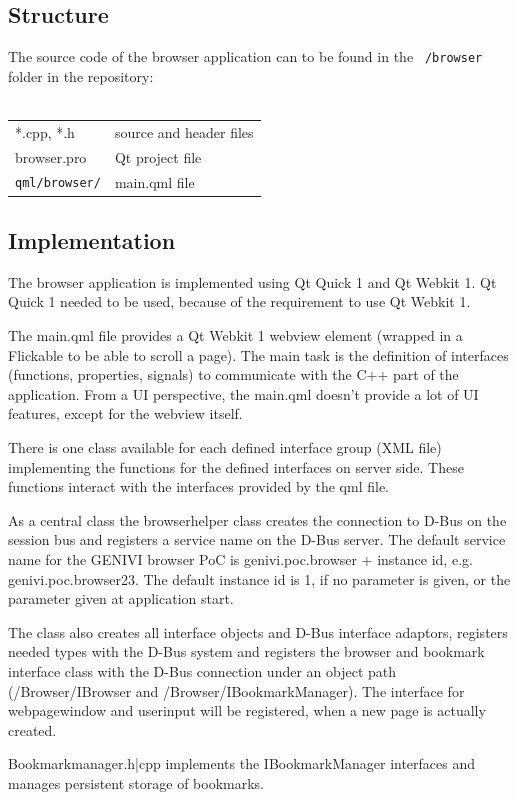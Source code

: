 \documentclass{pelagicore}
\begin{document}
\subsection{Structure}
The source code of the browser application can to be found in the {\tt
/browser} folder in the repository:
\\\\
\begin{tabular}{l l}
    *.cpp, *.h         & source and header files \\
    browser.pro        & Qt project file \\
    {\tt qml/browser/} & main.qml file
\end{tabular}

\subsection{Implementation}
The browser application is implemented using Qt Quick 1 and Qt Webkit 1. Qt
Quick 1 needed to be used, because of the requirement to use Qt Webkit 1.

The main.qml file provides a Qt Webkit 1 webview element (wrapped in a
Flickable to be able to scroll a page). The main task is the definition of
interfaces (functions, properties, signals) to communicate with the C++ part of
the application. From a UI perspective, the main.qml doesn’t provide a lot of
UI features, except for the webview itself.

There is one class available for each defined interface group (XML file)
implementing the functions for the defined interfaces on server side. These
functions interact with the interfaces provided by the qml file.

As a central class the browserhelper class creates the connection to D-Bus on
the session bus and registers a service name on the D-Bus server. The default
service name for the GENIVI browser PoC is genivi.poc.browser + instance id,
e.g. genivi.poc.browser23. The default instance id is 1, if no parameter is
given, or the parameter given at application start.

The class also creates all interface objects and D-Bus interface adaptors,
registers needed types with the D-Bus system and registers the browser and
bookmark interface class with the D-Bus connection under an object path
(/Browser/IBrowser and /Browser/IBookmarkManager). The interface for
webpagewindow and userinput will be registered, when a new page is actually
created.

Bookmarkmanager.h|cpp implements the IBookmarkManager interfaces and manages
persistent storage of bookmarks.
\end{document}
